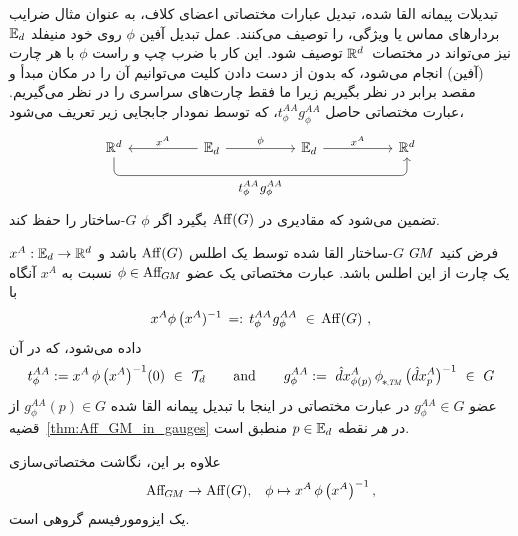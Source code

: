 تبدیلات پیمانه القا شده، تبدیل عبارات مختصاتی اعضای کلاف، به عنوان مثال ضرایب بردارهای مماس یا ویژگی، را توصیف می‌کنند.
عمل تبدیل آفین $\phi$ روی خود منیفلد $\mathbb{E}_d$ نیز می‌تواند در مختصات~$\mathbb{R}^d$ توصیف شود.
این کار با ضرب چپ و راست $\phi$ با هر چارت (آفین) انجام می‌شود، که بدون از دست دادن کلیت می‌توانیم آن را در مکان مبدأ و مقصد برابر در نظر بگیریم زیرا ما فقط چارت‌های سراسری را در نظر می‌گیریم.
عبارت مختصاتی حاصل $t_\phi^{AA} g_\phi^{AA}$، که توسط نمودار جابجایی زیر تعریف می‌شود،
\begin{equation}\label{cd:AffGM_in_chart}
	\begin{tikzcd}[row sep=2.5em, column sep=5em]
		\R^d
		\arrow[rrr, rounded corners, to path={
			|- node[below, pos=.75]{\small$t_\phi^{AA} \mkern1mu g_\phi^{AA}$} ([yshift=-3.ex, xshift=0ex]\tikztotarget.south)
			-- ([xshift=0ex]\tikztotarget.south)
		}]
		&
		\Euc_d
		\arrow[l, "{x^A}"']
		\arrow[r, "{\phi}"]
		&
		\Euc_d
		\arrow[r, "{x^A}"]
		&
		\R^d
	\end{tikzcd}
\end{equation}
تضمین می‌شود که مقادیری در $\operatorname{Aff}(G)$ بگیرد اگر $\phi$ $G$-ساختار را حفظ کند.
\begin{thm}
	\label{thm:Aff_GM_in_charts}
	فرض کنید $G\mkern-1.4muM$ $G$-ساختار القا شده توسط یک اطلس $\operatorname{Aff}(G)$ باشد و $x^A: \mathbb{E}_d \to \mathbb{R}^d$ یک چارت از این اطلس باشد.
	عبارت مختصاتی یک عضو $\phi \in \operatorname{Aff}_{\mkern-2muG\mkern-1.4muM}$ نسبت به $x^A$ آنگاه با
	\begin{align}\label{eq:AffGM_in_charts_eq}
		x^A \phi\, \big(x^A)^{-1} \,=:\, t_\phi^{AA} \mkern1mu g_\phi^{AA} \ \in\, \operatorname{Aff}(G) \ ,
	\end{align}
	داده می‌شود، که در آن
	\begin{align}
		t_\phi^{AA} := x^A \,\phi\, \big(x^A \big)^{-1} (0) \ \in\ \Trans_d
		\qquad \textup{and} \qquad
		g_\phi^{AA} := 
		\hat{d}x^A_{\phi(p)} \,\dphiTM\, \big(\hat{d}x^A_p \big)^{-1} \ \in\ G
	\end{align}
	عضو $g_\phi^{AA} \in G$ در عبارت مختصاتی در اینجا با تبدیل پیمانه القا شده $g_\phi^{AA}(p) \in G$ از قضیه~\ref{thm:Aff_GM_in_gauges} در \emph{هر} نقطه $p \in \mathbb{E}_d$ منطبق است.
	
	علاوه بر این، نگاشت مختصاتی‌سازی
	\begin{align}
		\operatorname{Aff}_{\mkern-2muG\mkern-1.4muM} \to \operatorname{Aff}(G),\,\ \ \phi \mapsto x^A \,\phi\, \big(x^A \big)^{-1} \,,
	\end{align}
	یک ایزومورفیسم گروهی است.
\end{thm}

